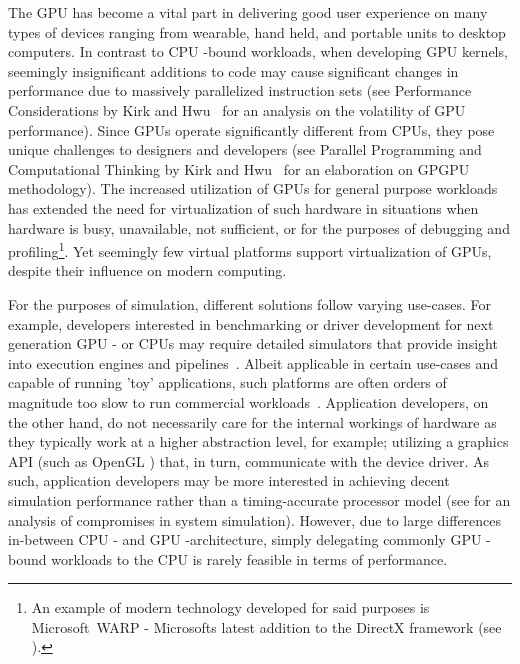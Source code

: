 The GPU has become a vital part in delivering good user experience on many types of devices ranging from wearable, hand held, and portable units to desktop computers.
In contrast to CPU -bound workloads, when developing GPU kernels, seemingly insignificant additions to code may cause significant changes in performance due to massively parallelized instruction sets (see Performance Considerations by Kirk and Hwu~ for an analysis on the volatility of GPU performance).
Since GPUs operate significantly different from CPUs, they pose unique challenges to designers and developers (see Parallel Programming and Computational Thinking by Kirk and Hwu~ for an elaboration on GPGPU methodology).
The increased utilization of GPUs for general purpose workloads has extended the need for virtualization of such hardware in situations when hardware is busy, unavailable, not sufficient, or for the purposes of debugging and profiling\footnote{An example of modern technology developed for said purposes is Microsoft~WARP - Microsofts latest addition to the DirectX framework (see ).}.
Yet seemingly few virtual platforms support virtualization of GPUs, despite their influence on modern computing.

For the purposes of simulation, different solutions follow varying use-cases. For example, developers interested in benchmarking or driver development for next generation GPU - or CPUs may require detailed simulators that provide insight into execution engines and pipelines~.
Albeit applicable in certain use-cases and capable of running 'toy' applications, such platforms are often orders of magnitude too slow to run commercial workloads~.
Application developers, on the other hand, do not necessarily care for the internal workings of hardware as they typically work at a higher abstraction level, for example; utilizing a graphics API (such as OpenGL ) that, in turn, communicate with the device driver.
As such, application developers may be more interested in achieving decent simulation performance rather than a timing-accurate processor model (see  for an analysis of compromises in system simulation).
However, due to large differences in-between CPU - and GPU -architecture, simply delegating commonly GPU -bound workloads to the CPU is rarely feasible in terms of performance.

